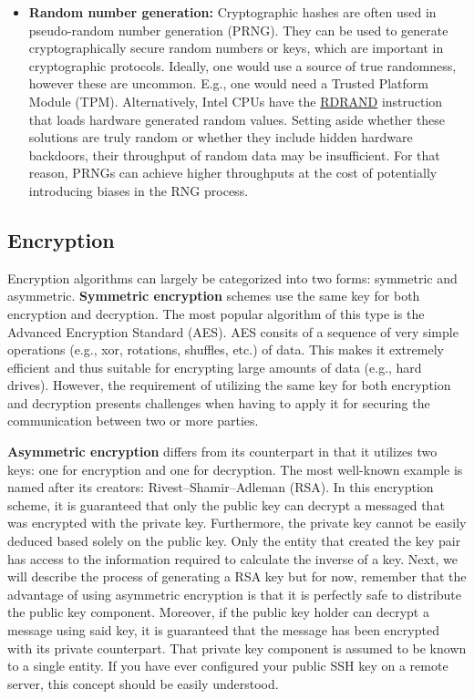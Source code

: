 \begin{itemize}
    \item \textbf{Random number generation:} Cryptographic hashes are often used
          in pseudo-random number generation (PRNG). They can be used to
          generate cryptographically secure random numbers or keys, which are
          important in cryptographic protocols. Ideally, one would use a source
          of true randomness, however these are uncommon. E.g., one would need
          a Trusted Platform Module (TPM). Alternatively, Intel CPUs have the
          \href{https://www.felixcloutier.com/x86/rdrand}{RDRAND} instruction
          that loads hardware generated random values. Setting aside whether
          these solutions are truly random or whether they include hidden
          hardware backdoors, their throughput of random data may be
          insufficient. For that reason, PRNGs can achieve higher throughputs
          at the cost of potentially introducing biases in the RNG process.
\end{itemize}


\subsection{Encryption}

Encryption algorithms can largely be categorized into two forms: symmetric and
asymmetric. \textbf{Symmetric encryption} schemes use the same key for both
encryption and decryption. The most popular algorithm of this type is the
Advanced Encryption Standard (AES). AES consits of a sequence of very simple
operations (e.g., xor, rotations, shuffles, etc.) of data. This makes it
extremely efficient and thus suitable for encrypting large amounts of data
(e.g., hard drives). However, the requirement of utilizing the same key for
both encryption and decryption presents challenges when having to apply it
for securing the communication between two or more parties.

\textbf{Asymmetric encryption} differs from its counterpart in that it utilizes
two keys: one for encryption and one for decryption. The most well-known example
is named after its creators: Rivest–Shamir–Adleman (RSA). In this encryption
scheme, it is guaranteed that only the public key can decrypt a messaged that
was encrypted with the private key. Furthermore, the private key cannot be
easily deduced based solely on the public key. Only the entity that created the
key pair has access to the information required to calculate the inverse of a
key. Next, we will describe the process of generating a RSA key but for now,
remember that the advantage of using asymmetric encryption is that it is
perfectly safe to distribute the public key component. Moreover, if the public
key holder can decrypt a message using said key, it is guaranteed that the
message has been encrypted with its private counterpart. That private key
component is assumed to be known to a single entity. If you have ever configured
your public SSH key on a remote server, this concept should be easily understood.

